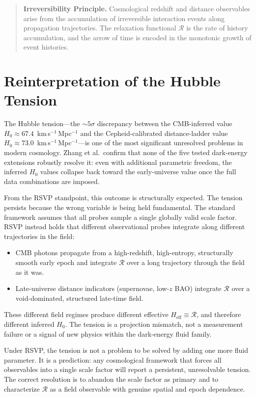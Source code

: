 \documentclass[12pt,a4paper]{article}
\theoremstyle{remark}
\newcommand{\Rcal}{\mathcal{R}}
\newcommand{\Heff}{H_{\mathrm{eff}}}
\begin{document}
\begin{quote}
\textbf{Irreversibility Principle.} Cosmological redshift and distance observables arise from the accumulation of irreversible interaction events along propagation trajectories. The relaxation functional $\Rcal$ is the rate of history accumulation, and the arrow of time is encoded in the monotonic growth of event histories.
\end{quote}

\section{Reinterpretation of the Hubble Tension}
\label{sec:hubble}

The Hubble tension---the $\sim 5\sigma$ discrepancy between the CMB-inferred value $H_0 \approx 67.4$~km\,s$^{-1}$\,Mpc$^{-1}$ and the Cepheid-calibrated distance-ladder value $H_0 \approx 73.0$~km\,s$^{-1}$\,Mpc$^{-1}$---is one of the most significant unresolved problems in modern cosmology. Zhang et al.\ confirm that none of the five tested dark-energy extensions robustly resolve it: even with additional parametric freedom, the inferred $H_0$ values collapse back toward the early-universe value once the full data combinations are imposed.

From the RSVP standpoint, this outcome is structurally expected. The tension persists because the wrong variable is being held fundamental. The standard framework assumes that all probes sample a single globally valid scale factor. RSVP instead holds that different observational probes integrate along different trajectories in the field:
\begin{itemize}[leftmargin=2em]
\item CMB photons propagate from a high-redshift, high-entropy, structurally smooth early epoch and integrate $\Rcal$ over a long trajectory through the field as it was.
\item Late-universe distance indicators (supernovae, low-$z$ BAO) integrate $\Rcal$ over a void-dominated, structured late-time field.
\end{itemize}
These different field regimes produce different effective $\Heff \equiv \Rcal$, and therefore different inferred $H_0$. The tension is a projection mismatch, not a measurement failure or a signal of new physics within the dark-energy fluid family.

Under RSVP, the tension is not a problem to be solved by adding one more fluid parameter. It is a prediction: any cosmological framework that forces all observables into a single scale factor will report a persistent, unresolvable tension. The correct resolution is to abandon the scale factor as primary and to characterize $\Rcal$ as a field observable with genuine spatial and epoch dependence.
\end{document}
